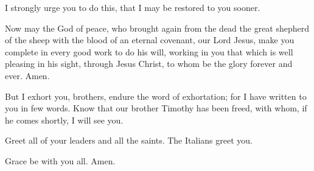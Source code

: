 {I strongly urge you to do this, that I may be restored to you sooner.
\par }{\PP {}Now may the God of peace, who brought again from the dead the great shepherd of the sheep with the blood of an eternal covenant, our Lord Jesus,
make you complete in every good work to do his will, working in you that which is well pleasing in his sight, through Jesus Christ, to whom be the glory forever and ever. Amen.
\par }{\PP {}But I exhort you, brothers, endure the word of exhortation; for I have written to you in few words.
Know that our brother Timothy has been freed, with whom, if he comes shortly, I will see you.
\par }{\PP {}Greet all of your leaders and all the saints. The Italians greet you.
\par }{\PP {}Grace be with you all. Amen.
\par }